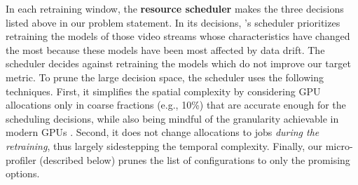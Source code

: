 In each retraining window, the {\bf resource scheduler} makes the three decisions listed above in our problem statement. %
In its decisions, {\name}'s scheduler prioritizes retraining the models of those video streams whose characteristics have changed the most because these models have been most affected by data drift. %
The scheduler decides against retraining the models which do not improve our target metric.  %
To prune the large decision space, the scheduler uses the following techniques. First, it simplifies the spatial complexity by considering GPU allocations only in coarse fractions (e.g., 10\%) that are  accurate enough for the scheduling decisions,  while also being mindful of the granularity achievable in modern GPUs \cite{nvidia-mps}. %
Second, it does not change allocations to jobs {\em during the retraining}, thus largely sidestepping the temporal complexity. Finally, our micro-profiler (described below) prunes the list of configurations to only the promising options.


